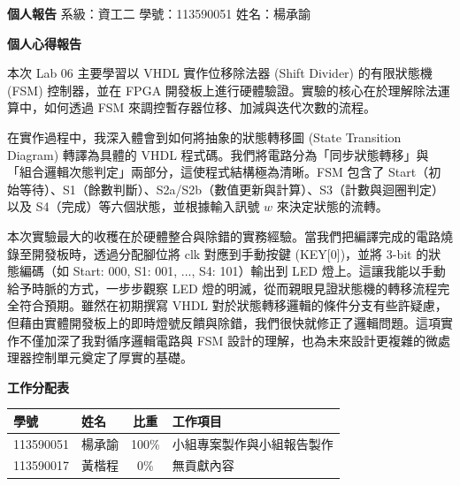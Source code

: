 \documentclass[12pt, a4paper]{article}
\begin{document}
\noindent
\textbf{個人報告} \hfill 系級：資工二 \quad 學號：113590051 \quad 姓名：楊承諭

\vspace{1.5em}
\begin{center}
    {\Large \textbf{個人心得報告}}
\end{center}
\vspace{1em}

本次 Lab 06 主要學習以 VHDL 實作位移除法器 (Shift Divider) 的有限狀態機 (FSM) 控制器，並在 FPGA 開發板上進行硬體驗證。實驗的核心在於理解除法運算中，如何透過 FSM 來調控暫存器位移、加減與迭代次數的流程。

在實作過程中，我深入體會到如何將抽象的狀態轉移圖 (State Transition Diagram) 轉譯為具體的 VHDL 程式碼。我們將電路分為「同步狀態轉移」與「組合邏輯次態判定」兩部分，這使程式結構極為清晰。FSM 包含了 Start（初始等待）、S1（餘數判斷）、S2a/S2b（數值更新與計算）、S3（計數與迴圈判定）以及 S4（完成）等六個狀態，並根據輸入訊號 $w$ 來決定狀態的流轉。

本次實驗最大的收穫在於硬體整合與除錯的實務經驗。當我們把編譯完成的電路燒錄至開發板時，透過分配腳位將 clk 對應到手動按鍵 (KEY[0])，並將 3-bit 的狀態編碼（如 Start: 000, S1: 001, ..., S4: 101）輸出到 LED 燈上。這讓我能以手動給予時脈的方式，一步步觀察 LED 燈的明滅，從而親眼見證狀態機的轉移流程完全符合預期。雖然在初期撰寫 VHDL 對於狀態轉移邏輯的條件分支有些許疑慮，但藉由實體開發板上的即時燈號反饋與除錯，我們很快就修正了邏輯問題。這項實作不僅加深了我對循序邏輯電路與 FSM 設計的理解，也為未來設計更複雜的微處理器控制單元奠定了厚實的基礎。

\vspace{2em}
\noindent
\textbf{工作分配表}
\vspace{0.5em}

\begin{table}[H]
    \centering
    \begin{tabular}{llcl}
        \toprule
        \textbf{學號} & \textbf{姓名} & \textbf{比重} & \textbf{工作項目} \\ \midrule
        113590051 & 楊承諭 & 100\% & 小組專案製作與小組報告製作 \\
        113590017 & 黃楷程 & 0\% & 無貢獻內容 \\ \bottomrule
    \end{tabular}
\end{table}
\end{document}
